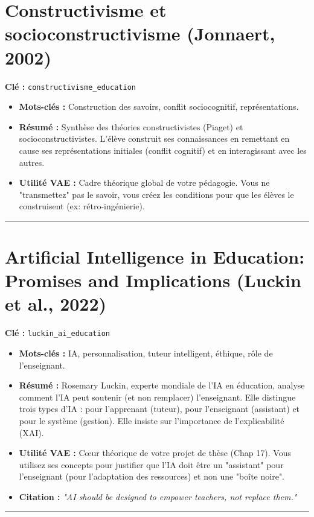 \section{Constructivisme et socioconstructivisme (Jonnaert, 2002)}
\textbf{Clé :} \texttt{constructivisme\_education}
\begin{itemize}
    \item \textbf{Mots-clés :} Construction des savoirs, conflit sociocognitif, représentations.
    \item \textbf{Résumé :} Synthèse des théories constructivistes (Piaget) et socioconstructivistes. L'élève construit ses connaissances en remettant en cause ses représentations initiales (conflit cognitif) et en interagissant avec les autres.
    \item \textbf{Utilité VAE :} Cadre théorique global de votre pédagogie. Vous ne "transmettez" pas le savoir, vous créez les conditions pour que les élèves le construisent (ex: rétro-ingénierie).
\end{itemize}
\hrule

\section{Artificial Intelligence in Education: Promises and Implications (Luckin et al., 2022)}
\textbf{Clé :} \texttt{luckin\_ai\_education}
\begin{itemize}
    \item \textbf{Mots-clés :} IA, personnalisation, tuteur intelligent, éthique, rôle de l'enseignant.
    \item \textbf{Résumé :} Rosemary Luckin, experte mondiale de l'IA en éducation, analyse comment l'IA peut soutenir (et non remplacer) l'enseignant. Elle distingue trois types d'IA : pour l'apprenant (tuteur), pour l'enseignant (assistant) et pour le système (gestion). Elle insiste sur l'importance de l'explicabilité (XAI).
    \item \textbf{Utilité VAE :} Cœur théorique de votre projet de thèse (Chap 17). Vous utilisez ses concepts pour justifier que l'IA doit être un "assistant" pour l'enseignant (pour l'adaptation des ressources) et non une "boîte noire".
    \item \textbf{Citation :} \textit{"AI should be designed to empower teachers, not replace them."}
\end{itemize}
\hrule

